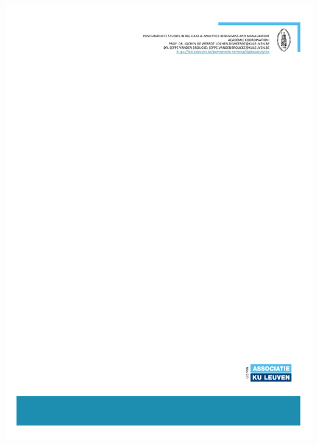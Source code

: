 \documentclass[12pt, letterpaper]{article}\usepackage[]{graphicx}\usepackage[]{color}
\begin{document}
\begin{titlepage}
    \begin{center}
	{\includegraphics[width = \textwidth]{"PG_Dissertation_template_last_page.pdf"}} 
            
    \end{center}
\end{titlepage}
\end{document}
